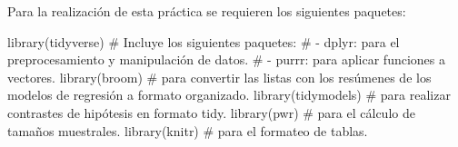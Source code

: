 \documentclass[
  a4paper,
]{scrreport}
\newenvironment{Shaded}{\begin{snugshade}}{\end{snugshade}}
\newcommand{\CommentTok}[1]{\textcolor[rgb]{0.37,0.37,0.37}{#1}}
\newcommand{\FunctionTok}[1]{\textcolor[rgb]{0.28,0.35,0.67}{#1}}
\newcommand{\NormalTok}[1]{\textcolor[rgb]{0.00,0.23,0.31}{#1}}
\theoremstyle{definition}
\theoremstyle{remark}
\begin{document}
Para la realización de esta práctica se requieren los siguientes
paquetes:

\begin{Shaded}
\begin{Highlighting}[]
\FunctionTok{library}\NormalTok{(tidyverse)}
\CommentTok{\# Incluye los siguientes paquetes:}
\CommentTok{\# {-} dplyr: para el preprocesamiento y manipulación de datos.}
\CommentTok{\# {-} purrr: para aplicar funciones a vectores.}
\FunctionTok{library}\NormalTok{(broom) }\CommentTok{\# para convertir las listas con los resúmenes de los modelos de regresión a formato organizado.}
\FunctionTok{library}\NormalTok{(tidymodels) }\CommentTok{\# para realizar contrastes de hipótesis en formato tidy.}
\FunctionTok{library}\NormalTok{(pwr) }\CommentTok{\# para el cálculo de tamaños muestrales.}
\FunctionTok{library}\NormalTok{(knitr) }\CommentTok{\# para el formateo de tablas.}
\end{Highlighting}
\end{Shaded}
\end{document}
